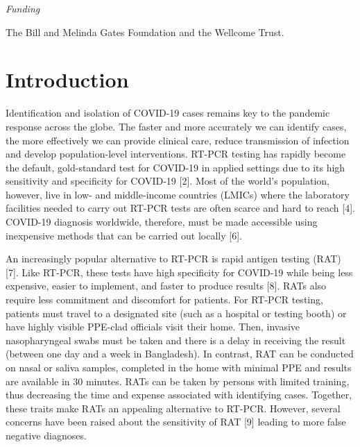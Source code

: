 \documentclass[]{elsarticle} %
\begin{document}
\emph{Funding}

The Bill and Melinda Gates Foundation and the Wellcome Trust.

\hypertarget{introduction}{%
\section{Introduction}\label{introduction}}

Identification and isolation of COVID-19 cases remains key to the pandemic response across the globe.
The faster and more accurately we can identify cases, the more effectively we can provide clinical care, reduce transmission of infection and develop population-level interventions.
RT-PCR testing has rapidly become the default, gold-standard test for COVID-19 in applied settings due to its high sensitivity and specificity for COVID-19 {[}2{]}.
Most of the world's population, however, live in low- and middle-income countries (LMICs) where the laboratory facilities needed to carry out RT-PCR tests are often scarce and hard to reach {[}4{]}.
COVID-19 diagnosis worldwide, therefore, must be made accessible using inexpensive methods that can be carried out locally {[}6{]}.

An increasingly popular alternative to RT-PCR is rapid antigen testing (RAT) {[}7{]}.
Like RT-PCR, these tests have high specificity for COVID-19 while being less expensive, easier to implement, and faster to produce results {[}8{]}.
RATs also require less commitment and discomfort for patients.
For RT-PCR testing, patients must travel to a designated site (such as a hospital or testing booth) or have highly visible PPE-clad officials visit their home.
Then, invasive nasopharyngeal swabs must be taken and there is a delay in receiving the result (between one day and a week in Bangladesh).
In contrast, RAT can be conducted on nasal or saliva samples, completed in the home with minimal PPE and results are available in 30 minutes.
RATs can be taken by persons with limited training, thus decreasing the time and expense associated with identifying cases.
Together, these traits make RATs an appealing alternative to RT-PCR.
However, several concerns have been raised about the sensitivity of RAT {[}9{]} leading to more false negative diagnoses.
\end{document}
